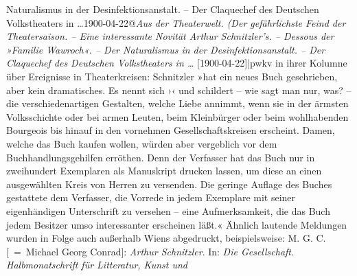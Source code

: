 \begin{ledgroupsized}[t]{13cm}
{{{{                  Naturalismus in der Desinfektionsanstalt. – Der Claquechef des Deutschen
                  Volkstheaters in …1900-04-22@\emph{Aus der Theaterwelt. (Der gefährlichste Feind der Theatersaison. – Eine interessante Novität Arthur Schnitzler’s. – Dessous der »Familie Wawroch«. – Der Naturalismus in der Desinfektionsanstalt. – Der Claquechef des Deutschen Volkstheaters in …} {[}1900-04-22{]}|pwkv} in ihrer Kolumne über Ereignisse in Theaterkreisen: Schnitzler »hat ein neues Buch
                     geschrieben, aber kein dramatisches. Es nennt sich ›‹ und schildert – wie sagt man nur, was? – die verschiedenartigen
                     Gestalten, welche Liebe annimmt, wenn sie in der ärmsten Volksschichte oder bei
                     armen Leuten, beim Kleinbürger oder beim wohlhabenden Bourgeois bis hinauf in
                     den vornehmen Gesellschaftskreisen erscheint. Damen, welche das Buch kaufen wollen, würden aber
                     vergeblich vor dem Buchhandlungsgehilfen erröthen. Denn der Verfasser hat das
                        Buch nur in
                     zweihundert Exemplaren als Manuskript drucken lassen, um diese an einen
                     ausgewählten Kreis von Herren zu versenden. Die geringe Auflage des Buches
                     gestattete dem Verfasser, die Vorrede in jedem Exemplare mit seiner
                     eigenhändigen Unterschrift zu versehen – eine Aufmerksamkeit, die das Buch
                     jedem Besitzer umso interessanter erscheinen läßt.« Ähnlich lautende
                  Meldungen wurden in Folge auch außerhalb Wiens
                  abgedruckt, beispielsweise: M. G. C. [ = Michael Georg Conrad]: \emph{Arthur Schnitzler}. In: \emph{Die Gesellschaft. Halbmonatschrift für Litteratur, Kunst und
}}}}
\end{ledgroupsized}

